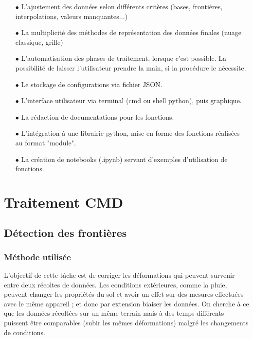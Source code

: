 \documentclass[12pt]{article}
\begin{document}
    \begin{enumerate}
        \item[$\bullet$] L'ajustement des données selon différents critères (bases, frontières, interpolations, valeurs manquantes...)
        \item[$\bullet$] La multiplicité des méthodes de représentation des données finales (nuage classique, grille)
        \item[$\bullet$] L'automatisation des phases de traitement, lorsque c'est possible. La possibilité de laisser l'utilisateur prendre la main, si la procédure le nécessite.
        \item[$\bullet$] Le stockage de configurations via fichier JSON.
        \item[$\bullet$] L'interface utilisateur via terminal (cmd ou shell python), puis graphique.
        \item[$\bullet$] La rédaction de documentations pour les fonctions.
        \item[$\bullet$] L'intégration à une librairie python, mise en forme des fonctions réalisées au format "module".
        \item[$\bullet$] La création de notebooks (.ipynb) servant d'exemples d'utilisation de fonctions.
        
    \end{enumerate}

\newpage
\section{Traitement CMD}

\subsection{Détection des frontières}\label{2-front}
\subsubsection{Méthode utilisée}
    L'objectif de cette tâche est de corriger les déformations qui peuvent survenir entre deux récoltes de données. Les conditions extérieures, comme la pluie, peuvent changer les propriétés du sol et avoir un effet sur des mesures effectuées avec le même appareil ; et donc par extension biaiser les données. On cherche à ce que les données récoltées sur un même terrain mais à des temps différents puissent être comparables (subir les mêmes déformations) malgré les changements de conditions.
\end{document}
